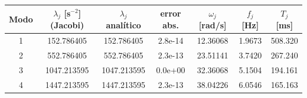 \begin{tabular}{c ccc cc c}
\toprule
Modo & $\lambda_j$ [s$^{-2}$] (Jacobi) & $\lambda_j$ analítico & error abs. & $\omega_j$ [rad/s] & $f_j$ [Hz] & $T_j$ [ms]\\
\midrule
1 & 152.786405 & 152.786405 & 2.8e-14 & 12.36068 & 1.9673 & 508.320\\
2 & 552.786405 & 552.786405 & 2.3e-13 & 23.51141 & 3.7420 & 267.240\\
3 & 1047.213595 & 1047.213595 & 0.0e+00 & 32.36068 & 5.1504 & 194.161\\
4 & 1447.213595 & 1447.213595 & 2.3e-13 & 38.04226 & 6.0546 & 165.163\\
\bottomrule
\end{tabular}
